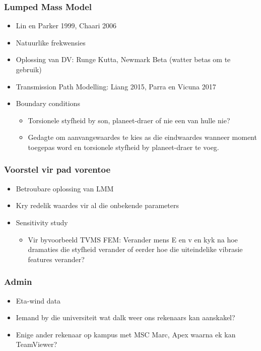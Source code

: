 \documentclass{beamer}
\begin{document}
\begin{frame}
\frametitle{Lumped Mass Model}
\begin{itemize}
	\item Lin en Parker 1999, Chaari 2006 
	\item Natuurlike frekwensies
	\item Oplossing van DV: Runge Kutta, Newmark Beta (watter betas om te gebruik)
	\item Transmission Path Modelling: Liang 2015, Parra en Vicuna 2017
	\item Boundary conditions
		\begin{itemize}
		\item Torsionele styfheid by son, planeet-draer of nie een van hulle nie?
		\item Gedagte om aanvangswaardes te kies as die eindwaardes wanneer moment toegepas word en torsionele styfheid by planeet-draer te voeg.
	\end{itemize}
\end{itemize}
\end{frame}


\begin{frame}
\frametitle{Voorstel vir pad vorentoe}
\begin{itemize}
	\item Betroubare oplossing van LMM
	\item Kry redelik waardes vir al die onbekende parameters
	
	\item Sensitivity study
	\begin{itemize}
	  	\item Vir byvoorbeeld TVMS FEM: Verander mens E en v en kyk na hoe dramaties die styfheid verander of eerder hoe die uiteindelike vibrasie features verander? 
	\end{itemize}
 
\end{itemize}
\end{frame}

\begin{frame}
\frametitle{Admin}
\begin{itemize}
	\item Eta-wind data
	\item Iemand by die universiteit wat dalk weer ons rekenaars kan aanskakel?
	\item Enige ander rekenaar op kampus met MSC Marc, Apex waarna ek kan TeamViewer?
	
\end{itemize}
\end{frame}
\end{document}
